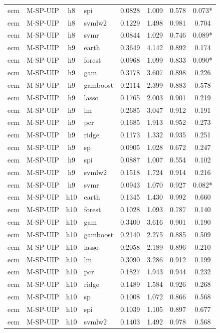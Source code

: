 \begin{ThreePartTable}
\begin{longtable}[t]{llclcccc}
ecm & M-SP-UIP & h8 & spi & 0.0828 & 1.009 & 0.578 & 0.073*\\
ecm & M-SP-UIP & h8 & svmlw2 & 0.1229 & 1.498 & 0.981 & 0.704\\
ecm & M-SP-UIP & h8 & svmr & 0.0844 & 1.029 & 0.746 & 0.089*\\
\addlinespace
ecm & M-SP-UIP & h9 & earth & 0.3649 & 4.142 & 0.892 & 0.174\\
ecm & M-SP-UIP & h9 & forest & 0.0968 & 1.099 & 0.833 & 0.090*\\
ecm & M-SP-UIP & h9 & gam & 0.3178 & 3.607 & 0.898 & 0.226\\
ecm & M-SP-UIP & h9 & gamboost & 0.2114 & 2.399 & 0.883 & 0.578\\
ecm & M-SP-UIP & h9 & lasso & 0.1765 & 2.003 & 0.901 & 0.219\\
ecm & M-SP-UIP & h9 & lm & 0.2685 & 3.047 & 0.912 & 0.191\\
ecm & M-SP-UIP & h9 & pcr & 0.1685 & 1.913 & 0.952 & 0.273\\
ecm & M-SP-UIP & h9 & ridge & 0.1173 & 1.332 & 0.935 & 0.251\\
ecm & M-SP-UIP & h9 & sp & 0.0905 & 1.028 & 0.672 & 0.247\\
ecm & M-SP-UIP & h9 & spi & 0.0887 & 1.007 & 0.554 & 0.102\\
ecm & M-SP-UIP & h9 & svmlw2 & 0.1518 & 1.724 & 0.914 & 0.216\\
ecm & M-SP-UIP & h9 & svmr & 0.0943 & 1.070 & 0.927 & 0.082*\\
\addlinespace
ecm & M-SP-UIP & h10 & earth & 0.1345 & 1.430 & 0.992 & 0.660\\
ecm & M-SP-UIP & h10 & forest & 0.1028 & 1.093 & 0.787 & 0.140\\
ecm & M-SP-UIP & h10 & gam & 0.3400 & 3.616 & 0.901 & 0.190\\
ecm & M-SP-UIP & h10 & gamboost & 0.2140 & 2.275 & 0.885 & 0.509\\
ecm & M-SP-UIP & h10 & lasso & 0.2058 & 2.189 & 0.896 & 0.210\\
ecm & M-SP-UIP & h10 & lm & 0.3090 & 3.286 & 0.912 & 0.199\\
ecm & M-SP-UIP & h10 & pcr & 0.1827 & 1.943 & 0.944 & 0.232\\
ecm & M-SP-UIP & h10 & ridge & 0.1489 & 1.584 & 0.926 & 0.268\\
ecm & M-SP-UIP & h10 & sp & 0.1008 & 1.072 & 0.866 & 0.568\\
ecm & M-SP-UIP & h10 & spi & 0.1039 & 1.105 & 0.897 & 0.677\\
ecm & M-SP-UIP & h10 & svmlw2 & 0.1403 & 1.492 & 0.978 & 0.568\\

\end{longtable}
\end{ThreePartTable}
